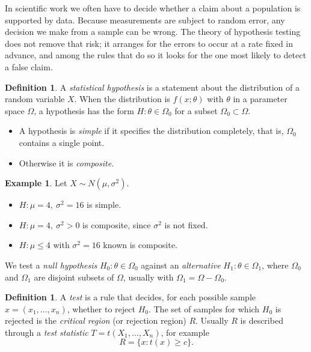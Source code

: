 \documentclass[12pt,a4paper]{report}
\theoremstyle{definition}
\newtheorem{definition}[thm]{Definition}
\newtheorem{example}[thm]{Example}
\theoremstyle{plain}
\begin{document}
In scientific work we often have to decide whether a claim about a population is
supported by data. Because measurements are subject to random error, any decision
we make from a sample can be wrong. The theory of hypothesis testing does not
remove that risk; it arranges for the errors to occur at a rate fixed in advance,
and among the rules that do so it looks for the one most likely to detect a false
claim.

\begin{definition}
\label{def:hypothesis}
A \emph{statistical hypothesis} is a statement about the distribution of a random
variable $X$. When the distribution is $f(x;\theta)$ with $\theta$ in a parameter
space $\Omega$, a hypothesis has the form $H\colon \theta\in\Omega_0$ for a subset
$\Omega_0\subset\Omega$.
\begin{itemize}
\item A hypothesis is \emph{simple} if it specifies the distribution completely,
that is, $\Omega_0$ contains a single point.
\item Otherwise it is \emph{composite}.
\end{itemize}
\end{definition}

\begin{example}
\label{ex:simplecomposite}
Let $X\sim N(\mu,\sigma^2)$.
\begin{itemize}
\item $H\colon \mu = 4,\ \sigma^2 = 16$ is simple.
\item $H\colon \mu = 4,\ \sigma^2>0$ is composite, since $\sigma^2$ is not fixed.
\item $H\colon \mu\le 4$ with $\sigma^2 = 16$ known is composite.
\end{itemize}
\end{example}

We test a \emph{null hypothesis} $H_0\colon\theta\in\Omega_0$ against an
\emph{alternative} $H_1\colon\theta\in\Omega_1$, where $\Omega_0$ and $\Omega_1$
are disjoint subsets of $\Omega$, usually with $\Omega_1 = \Omega - \Omega_0$.

\begin{definition}
\label{def:test}
A \emph{test} is a rule that decides, for each possible sample
$x = (x_1,\dots,x_n)$, whether to reject $H_0$. The set of samples for which $H_0$
is rejected is the \emph{critical region} (or rejection region) $R$. Usually $R$ is
described through a \emph{test statistic} $T = t(X_1,\dots,X_n)$, for example
\[R = \{x : t(x)\ge c\} .\]
\end{definition}
\end{document}
